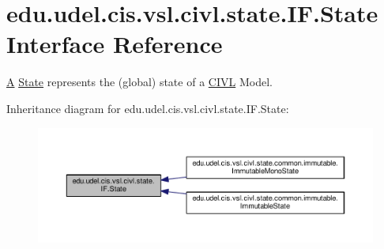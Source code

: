\hypertarget{interfaceedu_1_1udel_1_1cis_1_1vsl_1_1civl_1_1state_1_1IF_1_1State}{}\section{edu.\+udel.\+cis.\+vsl.\+civl.\+state.\+I\+F.\+State Interface Reference}
\label{interfaceedu_1_1udel_1_1cis_1_1vsl_1_1civl_1_1state_1_1IF_1_1State}


\hyperlink{structA}{A} \hyperlink{interfaceedu_1_1udel_1_1cis_1_1vsl_1_1civl_1_1state_1_1IF_1_1State}{State} represents the (global) state of a \hyperlink{classedu_1_1udel_1_1cis_1_1vsl_1_1civl_1_1CIVL}{C\+I\+V\+L} Model.  




Inheritance diagram for edu.\+udel.\+cis.\+vsl.\+civl.\+state.\+I\+F.\+State\+:
\nopagebreak
\begin{figure}[H]
\begin{center}
\leavevmode
\includegraphics[width=350pt]{interfaceedu_1_1udel_1_1cis_1_1vsl_1_1civl_1_1state_1_1IF_1_1State__inherit__graph}
\end{center}
\end{figure}
